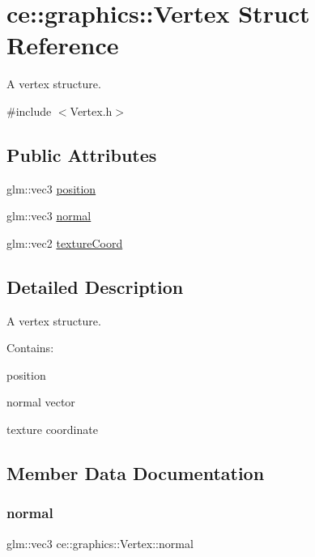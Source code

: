 \hypertarget{structce_1_1graphics_1_1_vertex}{}\section{ce\+:\+:graphics\+:\+:Vertex Struct Reference}
\label{structce_1_1graphics_1_1_vertex}


A vertex structure.  




{\ttfamily \#include $<$Vertex.\+h$>$}

\subsection*{Public Attributes}
\begin{DoxyCompactItemize}
\item 
glm\+::vec3 \hyperlink{structce_1_1graphics_1_1_vertex_aa38ddb0b29a672e67e790869f38282ff}{position}
\item 
glm\+::vec3 \hyperlink{structce_1_1graphics_1_1_vertex_ac91e1a269df3e9a9a3a69543f1f68f4b}{normal}
\item 
glm\+::vec2 \hyperlink{structce_1_1graphics_1_1_vertex_a1dd8f6082878c241afc66226b3c45ea0}{texture\+Coord}
\end{DoxyCompactItemize}


\subsection{Detailed Description}
A vertex structure. 

Contains\+:
\begin{DoxyItemize}
\item position
\item normal vector
\item texture coordinate 
\end{DoxyItemize}

\subsection{Member Data Documentation}
\mbox{\label{structce_1_1graphics_1_1_vertex_ac91e1a269df3e9a9a3a69543f1f68f4b}} 
\subsubsection{\texorpdfstring{normal}{normal}}
{\footnotesize\ttfamily glm\+::vec3 ce\+::graphics\+::\+Vertex\+::normal}

